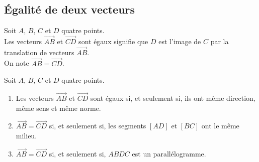 \newpage

\subsection{Égalité de deux vecteurs}
\begin{minipage}[c]{0.7\linewidth}
\begin{Définition}
Soit $A$, $B$, $C$ et $D$ quatre points.\\
Les vecteurs $\overrightarrow
{AB}$ et $\overrightarrow{CD}$ sont égaux signifie que $D$ est l'image de $C$ par la translation de vecteurs $\overrightarrow{AB}$. \\On note $\overrightarrow{AB}=\overrightarrow{CD}$.

\end{Définition}

\begin{Propriété}
Soit $A$, $B$, $C$ et $D$ quatre points.
\begin{enumerate}
\item Les vecteurs $\overrightarrow{AB}$ et $\overrightarrow{CD}$ sont égaux si, et seulement si, ils ont même direction, même sens et même norme.
\item $\overrightarrow{AB}=\overrightarrow{CD}$ si, et seulement si, les segments $[AD]$ et $[BC]$ ont le même milieu.
\item $\overrightarrow{AB}=\overrightarrow{CD}$ si, et seulement si, $ABDC$ est un parallélogramme.
\end{enumerate}

\end{Propriété}
\end{minipage} \hfill
\begin{minipage}[c]{0.3\linewidth}
\begin{center}
\end{center}
\end{minipage}






